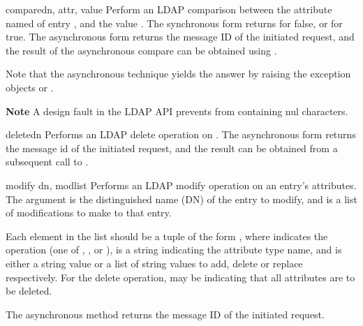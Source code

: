 
\begin{methoddesc}[LDAP]{compare}{dn, attr, value} %
Perform an LDAP comparison between the attribute named  of 
entry , and the value . The synchronous form
returns  for false, or  for true.
The asynchronous form returns the message ID of the initiated request, 
and the result of the asynchronous compare can be obtained using 
.  

Note that the asynchronous technique yields the answer
by raising the exception objects  or
.

\textbf{Note} A design fault in the LDAP API prevents  
from containing nul characters.
\end{methoddesc}


\begin{methoddesc}[LDAP]{delete}{dn} %
Performs an LDAP delete operation on . The asynchronous form
returns the message id of the initiated request, and the result can be obtained
from a subsequent call to .
\end{methoddesc}


\begin{methoddesc}[LDAP]{modify}{ dn, modlist } %
Performs an LDAP modify operation on an entry's attributes. 
The  argument is the distinguished name (DN) of the entry to modify,
and  is a list of modifications to make to that entry.

Each element in the list  should be a tuple of the form 
,
where  indicates the operation (one of , 
, or ),
 is a string indicating the attribute type name, and 
 is either a string value or a list of string values to add, 
delete or replace respectively.  For the delete operation, 
may be  indicating that all attributes are to be deleted.

The asynchronous method  returns the message ID of the 
initiated request.

\end{methoddesc}

